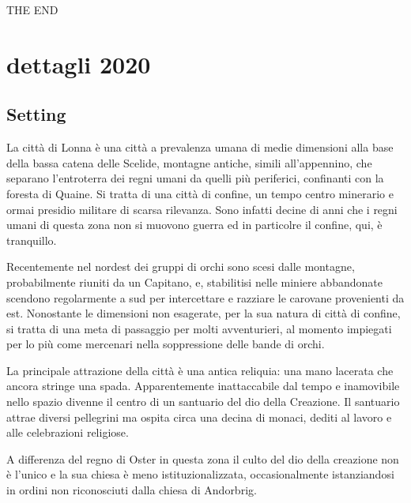 \documentclass[10pt,twoside, twocolumn, openany]{dndbook}
\begin{document}
THE END

\clearpage

\section{dettagli 2020}

\subsection{Setting}
La città di Lonna è una città a prevalenza umana di medie dimensioni alla base della bassa catena delle Scelide, montagne antiche, simili all'appennino, che separano l'entroterra dei regni umani da quelli più periferici, confinanti con la foresta di Quaine.
Si tratta di una città di confine, un tempo centro minerario e ormai presidio militare di scarsa rilevanza. Sono infatti decine di anni che i regni umani di questa zona non si muovono guerra ed in particolre il confine, qui, è tranquillo.

Recentemente nel nordest dei gruppi di orchi sono scesi dalle montagne, probabilmente riuniti da un Capitano, e, stabilitisi nelle miniere abbandonate scendono regolarmente a sud per intercettare e razziare le carovane provenienti da est.
Nonostante le dimensioni non esagerate, per la sua natura di città di confine, si tratta di una meta di passaggio per molti avventurieri, al momento impiegati per lo più come mercenari nella soppressione delle bande di orchi.

La principale attrazione della città è una antica reliquia: una mano lacerata che ancora stringe una spada. Apparentemente inattaccabile dal tempo e inamovibile nello spazio divenne il centro di un santuario del dio della Creazione.
Il santuario attrae diversi pellegrini ma ospita circa una decina di monaci, dediti al lavoro e alle celebrazioni religiose.

A differenza del regno di Oster in questa zona il culto del dio della creazione non è l'unico e la sua chiesa è meno istituzionalizzata, occasionalmente istanziandosi in ordini non riconosciuti dalla chiesa di Andorbrig.
\end{document}
